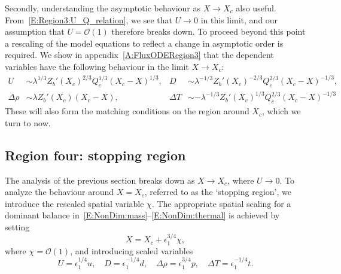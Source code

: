 \documentclass{jfm}
\newcommand{\order}[1]{\mathcal{O}(#1)}
\newcommand{\epsone}{\epsilon_{1}} %
\renewcommand{\p}{p} %
\renewcommand{\t}{t} %
\begin{document}
Secondly, understanding the asymptotic behaviour as $X \to X_c$ also useful. From~\eqref{E:Region3:U_Q_relation}, we see that $U \to 0$ in this limit, and our assumption that $U = \order{1}$ therefore breaks down. To proceed beyond this point a rescaling of the model equations to reflect a change in asymptotic order is required. We show in appendix~\ref{A:FluxODERegion3} that the dependent variables have the following behaviour in the limit $X \to X_c$:
\begin{align}
U &\sim \lambda^{1/3} Z_b'(X_c)^{2/3} Q_c^{1/3}(X_c - X)^{1/3}, & D &\sim \lambda^{-1/3} Z_b'(X_c)^{-2/3} Q_c^{2/3}(X_c - X)^{-1/3},\label{E:Region3:X_to_Xc1}\\
\Delta \rho &\sim  \lambda Z_b'(X_c) (X_c - X), & \Delta T &\sim -\lambda^{-1/3} Z_b'(X_c)^{1/3} Q_c^{2/3}(X_c - X)^{-1/3}\label{E:Region3:X_to_Xc2}
\end{align}
These will also form the matching conditions on the region around $X_c$, which we turn to now.



\subsection{Region four: stopping region}\label{S:Asymptotics:Region4}
The analysis of the previous section breaks down as $X \to X_c$, where $U \to 0$. To analyze the behaviour around $X = X_c$, referred to as the `stopping region', we introduce the rescaled spatial variable $\chi$. The appropriate spatial scaling for a dominant balance in~\eqref{E:NonDim:mass}--\eqref{E:NonDim:thermal} is achieved by setting 
\begin{equation}\label{E:Region4:X_scaling}
X = X_c + \epsone^{3/4}\chi,
\end{equation}
where $\chi = \order{1}$, and introducing scaled variables
\begin{equation}\label{E:Region4:var_scaling}
U = \epsone^{1/4}u, \quad D = \epsone^{-1/4}d, \quad \Delta \rho = \epsone^{3/4}\p, \quad  \Delta T = \epsone^{-1/4} \t.
\end{equation}
\end{document}
